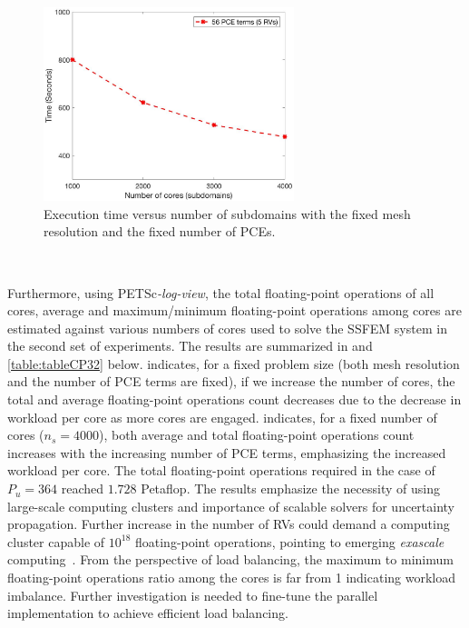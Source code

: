 \documentclass[letter,1p,11pt,oneside,onecolumn,sort&compress]{elsarticle}
\begin{document}
\begin{figure}[htbp]
\centering
\includegraphics[width=0.65\textwidth,height=0.35\textheight]{plots/cedar_timeVsProcs.eps}
\caption{Execution time versus number of subdomains with the fixed mesh resolution and the fixed number of PCEs.}
\label{fig:cedar_timeVsProcs}
\end{figure}

\

Furthermore, using PETSc{\it{-log-view}}, the total floating-point operations of all cores, average and maximum/minimum floating-point operations among cores are estimated against various numbers of cores used to solve the SSFEM system in the second set of experiments.
The results are summarized in  and \ref{table:tableCP32} below.
 indicates, for a fixed problem size (both mesh resolution and the number of PCE terms are fixed), if we increase the number of cores, the total and average floating-point operations count decreases due to the decrease in workload per core as more cores are engaged.
 indicates, for a fixed number of cores ($n_s=4000$), both average and total floating-point operations count increases with the increasing number of PCE terms, emphasizing the increased workload per core.
The total floating-point operations required in the case of $P_u=364$ reached $1.728$ Petaflop. The results emphasize the necessity of using large-scale computing clusters and importance of scalable solvers for uncertainty propagation. Further increase in the number of RVs could demand a computing cluster capable of $10^{18}$ floating-point operations, pointing to emerging {\it{exascale}} computing~\cite{ashby2010opportunities,duff2011european}.
From the perspective of load balancing, the maximum to minimum floating-point operations ratio among the cores is far from 1 indicating workload imbalance. Further investigation is needed to fine-tune the parallel implementation to achieve efficient load balancing.
\end{document}
